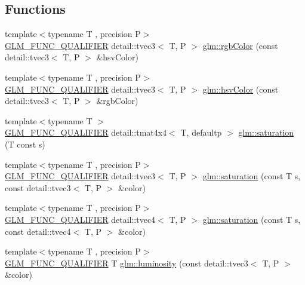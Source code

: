 \subsection*{Functions}
\begin{DoxyCompactItemize}
\item 
{\footnotesize template$<$typename T , precision P$>$ }\\\hyperlink{setup_8hpp_a33fdea6f91c5f834105f7415e2a64407}{G\+L\+M\+\_\+\+F\+U\+N\+C\+\_\+\+Q\+U\+A\+L\+I\+F\+I\+ER} detail\+::tvec3$<$ T, P $>$ \hyperlink{group__gtx__color__space_gafe29cc37c2675aee66c9f9ae3e5e7294}{glm\+::rgb\+Color} (const detail\+::tvec3$<$ T, P $>$ \&hsv\+Color)
\item 
{\footnotesize template$<$typename T , precision P$>$ }\\\hyperlink{setup_8hpp_a33fdea6f91c5f834105f7415e2a64407}{G\+L\+M\+\_\+\+F\+U\+N\+C\+\_\+\+Q\+U\+A\+L\+I\+F\+I\+ER} detail\+::tvec3$<$ T, P $>$ \hyperlink{group__gtx__color__space_ga9d3d99c06af10403d317dec0cb655090}{glm\+::hsv\+Color} (const detail\+::tvec3$<$ T, P $>$ \&rgb\+Color)
\item 
{\footnotesize template$<$typename T $>$ }\\\hyperlink{setup_8hpp_a33fdea6f91c5f834105f7415e2a64407}{G\+L\+M\+\_\+\+F\+U\+N\+C\+\_\+\+Q\+U\+A\+L\+I\+F\+I\+ER} detail\+::tmat4x4$<$ T, defaultp $>$ \hyperlink{group__gtx__color__space_ga444bcc8582eaa894acf405762ba2a5ff}{glm\+::saturation} (T const s)
\item 
{\footnotesize template$<$typename T , precision P$>$ }\\\hyperlink{setup_8hpp_a33fdea6f91c5f834105f7415e2a64407}{G\+L\+M\+\_\+\+F\+U\+N\+C\+\_\+\+Q\+U\+A\+L\+I\+F\+I\+ER} detail\+::tvec3$<$ T, P $>$ \hyperlink{group__gtx__color__space_ga1a6fe89b5effcc718b5f49de5bb50fad}{glm\+::saturation} (const T s, const detail\+::tvec3$<$ T, P $>$ \&color)
\item 
{\footnotesize template$<$typename T , precision P$>$ }\\\hyperlink{setup_8hpp_a33fdea6f91c5f834105f7415e2a64407}{G\+L\+M\+\_\+\+F\+U\+N\+C\+\_\+\+Q\+U\+A\+L\+I\+F\+I\+ER} detail\+::tvec4$<$ T, P $>$ \hyperlink{group__gtx__color__space_ga42cc34c45ab66e010c629106952c8bdd}{glm\+::saturation} (const T s, const detail\+::tvec4$<$ T, P $>$ \&color)
\item 
{\footnotesize template$<$typename T , precision P$>$ }\\\hyperlink{setup_8hpp_a33fdea6f91c5f834105f7415e2a64407}{G\+L\+M\+\_\+\+F\+U\+N\+C\+\_\+\+Q\+U\+A\+L\+I\+F\+I\+ER} T \hyperlink{group__gtx__color__space_ga3fb6710bbbf4f3e2303b06946e9cf00c}{glm\+::luminosity} (const detail\+::tvec3$<$ T, P $>$ \&color)
\end{DoxyCompactItemize}
